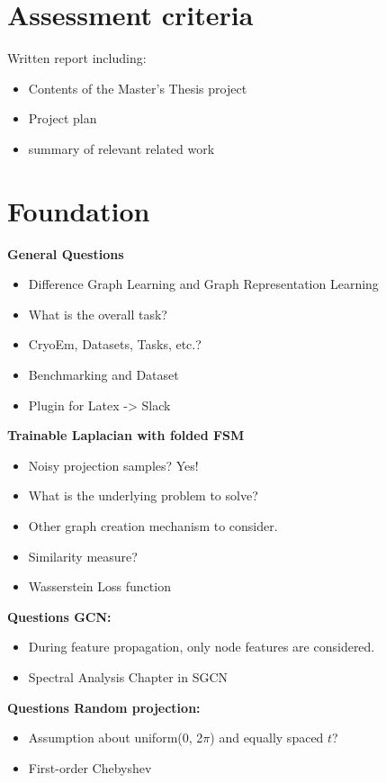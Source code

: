 \chapter{Assessment criteria}
Written report including: 
\begin{itemize}
    \item Contents of the Master's Thesis project
    \item Project plan
    \item summary of relevant related work
\end{itemize}

\chapter{Foundation}

\textbf{General Questions}
\begin{itemize}
    \item Difference Graph Learning and Graph Representation Learning
    \item What is the overall task?
    \item CryoEm, Datasets, Tasks, etc.?
    \item Benchmarking and Dataset
    \item Plugin for Latex -> Slack
\end{itemize}

\textbf{Trainable Laplacian with folded FSM}
\begin{itemize}
    \item Noisy projection samples? Yes!
    \item What is the underlying problem to solve?
    \item Other graph creation mechanism to consider.
    \item Similarity measure?
    \item Wasserstein Loss function
\end{itemize}

\textbf{Questions GCN:}
\begin{itemize}
    \item During feature propagation, only node features are considered.
    \item Spectral Analysis Chapter in SGCN
\end{itemize}

\textbf{Questions Random projection:}
\begin{itemize}
    \item Assumption about uniform(0, 2$\pi$) and equally spaced $t$?
    \item First-order Chebyshev
\end{itemize}

